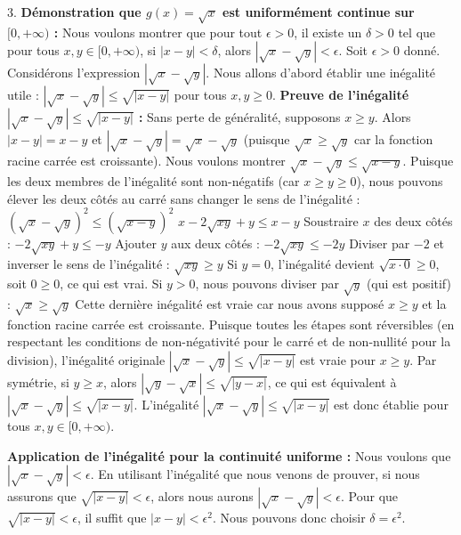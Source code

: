 \documentclass[12pt,a4paper]{report}
\begin{document}
3.  \textbf{Démonstration que $g(x) = \sqrt{x}$ est uniformément continue sur $[0, +\infty)$ :}
    Nous voulons montrer que pour tout $\epsilon > 0$, il existe un $\delta > 0$ tel que pour tous $x, y \in [0, +\infty)$, si $|x - y| < \delta$, alors $|\sqrt{x} - \sqrt{y}| < \epsilon$.
    Soit $\epsilon > 0$ donné.
    Considérons l'expression $|\sqrt{x} - \sqrt{y}|$.
    Nous allons d'abord établir une inégalité utile : $|\sqrt{x} - \sqrt{y}| \le \sqrt{|x - y|}$ pour tous $x, y \ge 0$.
    \textbf{Preuve de l'inégalité $|\sqrt{x} - \sqrt{y}| \le \sqrt{|x - y|}$ :}
    Sans perte de généralité, supposons $x \ge y$. Alors $|x - y| = x - y$ et $|\sqrt{x} - \sqrt{y}| = \sqrt{x} - \sqrt{y}$ (puisque $\sqrt{x} \ge \sqrt{y}$ car la fonction racine carrée est croissante).
    Nous voulons montrer $\sqrt{x} - \sqrt{y} \le \sqrt{x - y}$.
    Puisque les deux membres de l'inégalité sont non-négatifs (car $x \ge y \ge 0$), nous pouvons élever les deux côtés au carré sans changer le sens de l'inégalité :
    $(\sqrt{x} - \sqrt{y})^2 \le (\sqrt{x - y})^2$
    $x - 2\sqrt{xy} + y \le x - y$
    Soustraire $x$ des deux côtés :
    $-2\sqrt{xy} + y \le -y$
    Ajouter $y$ aux deux côtés :
    $-2\sqrt{xy} \le -2y$
    Diviser par $-2$ et inverser le sens de l'inégalité :
    $\sqrt{xy} \ge y$
    Si $y=0$, l'inégalité devient $\sqrt{x \cdot 0} \ge 0$, soit $0 \ge 0$, ce qui est vrai.
    Si $y > 0$, nous pouvons diviser par $\sqrt{y}$ (qui est positif) :
    $\sqrt{x} \ge \sqrt{y}$
    Cette dernière inégalité est vraie car nous avons supposé $x \ge y$ et la fonction racine carrée est croissante.
    Puisque toutes les étapes sont réversibles (en respectant les conditions de non-négativité pour le carré et de non-nullité pour la division), l'inégalité originale $|\sqrt{x} - \sqrt{y}| \le \sqrt{|x - y|}$ est vraie pour $x \ge y$.
    Par symétrie, si $y \ge x$, alors $|\sqrt{y} - \sqrt{x}| \le \sqrt{|y - x|}$, ce qui est équivalent à $|\sqrt{x} - \sqrt{y}| \le \sqrt{|x - y|}$.
    L'inégalité $|\sqrt{x} - \sqrt{y}| \le \sqrt{|x - y|}$ est donc établie pour tous $x, y \in [0, +\infty)$.

    \textbf{Application de l'inégalité pour la continuité uniforme :}
    Nous voulons que $|\sqrt{x} - \sqrt{y}| < \epsilon$.
    En utilisant l'inégalité que nous venons de prouver, si nous assurons que $\sqrt{|x - y|} < \epsilon$, alors nous aurons $|\sqrt{x} - \sqrt{y}| < \epsilon$.
    Pour que $\sqrt{|x - y|} < \epsilon$, il suffit que $|x - y| < \epsilon^2$.
    Nous pouvons donc choisir $\delta = \epsilon^2$.
\end{document}
